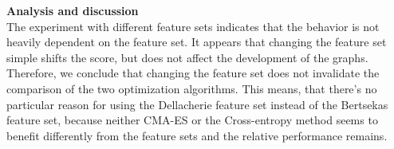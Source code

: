 \textbf{Analysis and discussion}\\
The experiment with different feature sets indicates that the behavior 
is not heavily dependent on the feature set.
It appears that changing the feature set simple shifts the score,
but does not affect the development of the graphs.\\
Therefore, we conclude that changing the feature set does not invalidate
the comparison of the two optimization algorithms. This means, that there's
no particular reason for using the Dellacherie feature set instead of the 
Bertsekas feature set, because neither CMA-ES or the Cross-entropy method seems
to benefit differently from the feature sets and the relative performance remains.
